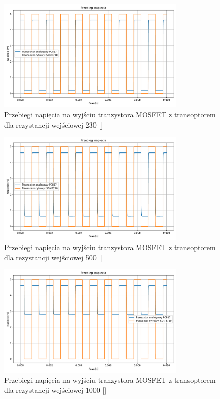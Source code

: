 \documentclass[11pt]{article}
\begin{document}
\begin{figure}[H]
\centering
\includegraphics[width=0.8\textwidth]{aun1_gate_circuit_digital_vs_analog_rin230ohm.pdf}
\caption{Przebiegi napięcia na wyjściu tranzystora MOSFET z transoptorem dla rezystancji wejściowej 230 [\Omega]}
\end{figure}

\begin{figure}[H]
\centering
\includegraphics[width=0.8\textwidth]{aun1_gate_circuit_digital_vs_analog_rin500ohm.pdf}
\caption{Przebiegi napięcia na wyjściu tranzystora MOSFET z transoptorem dla rezystancji wejściowej 500 [\Omega]}
\end{figure}

\begin{figure}[H]
\centering
\includegraphics[width=0.8\textwidth]{aun1_gate_circuit_digital_vs_analog_rin1000ohm.pdf}
\caption{Przebiegi napięcia na wyjściu tranzystora MOSFET z transoptorem dla rezystancji wejściowej 1000 [\Omega]}
\end{figure}
\end{document}
